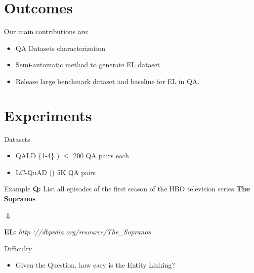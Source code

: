 \documentclass[]{beamer}
\def\mAlertSpace{\vspace{0.5em}}
\newcommand{\mSlideTitle}{{{\secname}}}
\begin{document}
\section{Outcomes}
  \begin{frame}{\mSlideTitle}
    \begin{alertblock}{Our main contributions are:}
      \begin{itemize}
        \item QA Datasets characterization
        \item Semi-automatic method to generate EL dataset.
        \item Release large benchmark dataset and baseline for EL in QA.
      \end{itemize}
    \end{alertblock}      
  \end{frame}

\section{Experiments}
  \begin{frame}{\mSlideTitle}
    \begin{alertblock}{Datasets}
      \begin{itemize}
        \item QALD \{1-4\} \cite{Unger2014}) $\le$ 200 QA pairs each
        \item LC-QuAD (\cite{trivedi2017lc}) 5K QA pairs
      \end{itemize}
    \end{alertblock}
    \begin{alertblock}{Example}
      \mAlertSpace
      \textbf{Q:} List all episodes of the first season of the HBO television series \textbf{The Sopranos} \\
      {\centering
        $\Downarrow$ \par
      }
      \textbf{EL:} \textit{http ://dbpedia.org/resource/The\_Sopranos}
    \end{alertblock}
  \end{frame}

  \begin{frame}{\mSlideTitle}
    \begin{alertblock}{Difficulty}
      \begin{itemize}
        \item Given the Question, how easy is the Entity Linking?
      \end{itemize}
      
    \end{alertblock}
  \end{frame}
\end{document}
